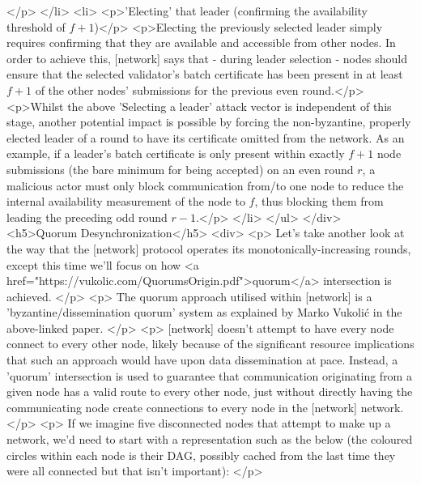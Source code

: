 \begin{rawhtml}
                    		</p>
               		</li>
               		<li>
	                    	<p>'Electing' that leader (confirming the availability threshold of $f + 1$)</p>
	                    	<p>Electing the previously selected leader simply requires confirming that they are available and accessible from other nodes. In order to achieve this, [network] says that - during leader selection - nodes should ensure that the selected validator's batch certificate has been present in at least $f + 1$ of the other nodes' submissions for the previous even round.</p>
	                    	<p>Whilst the above 'Selecting a leader' attack vector is independent of this stage, another potential impact is possible by forcing the non-byzantine, properly elected leader of a round to have its certificate omitted from the network. As an example, if a leader's batch certificate is only present within exactly $f + 1$ node submissions (the bare minimum for being accepted) on an even round $r$, a malicious actor must only block communication from/to one node to reduce the internal availability measurement of the node to $f$, thus blocking them from leading the preceding odd round $r - 1$.</p>
               		</li>
               	</ul>
            </div>
            <h5>Quorum Desynchronization</h5>
            <div>
	            <p>
	            	Let's take another look at the way that the [network] protocol operates its monotonically-increasing rounds, except this time we'll focus on how <a href="https://vukolic.com/QuorumsOrigin.pdf">quorum</a> intersection is achieved.
	            </p>
	            <p>
	            	The quorum approach utilised within [network] is a 'byzantine/dissemination quorum' system as explained by Marko Vukolić in the above-linked paper.
	            </p>
	            <p>
	            	[network] doesn't attempt to have every node connect to every other node, likely because of the significant resource implications that such an approach would have upon data dissemination at pace. Instead, a 'quorum' intersection is used to guarantee that communication originating from a given node has a valid route to every other node, just without directly having the communicating node create connections to every node in the [network] network.
	            </p>
	            <p>
	            	If we imagine five disconnected nodes that attempt to make up a network, we'd need to start with a representation such as the below (the coloured circles within each node is their DAG, possibly cached from the last time they were all connected but that isn't important):
	            </p>

\end{rawhtml}

